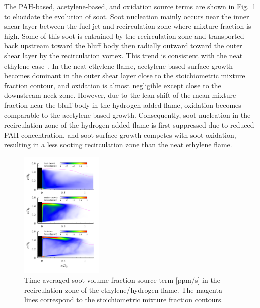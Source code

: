 \documentclass[review,3p,times]{elsarticle}
\begin{document}
The PAH-based, acetylene-based, and oxidation source terms are shown in Fig.~\ref{fig:sourceterms} to elucidate the evolution of soot. Soot nucleation mainly occurs near the inner shear layer between the fuel jet and recirculation zone where mixture fraction is high.  Some of this soot is entrained by the recirculation zone and transported back upstream toward the bluff body then radially outward toward the outer shear layer by the recirculation vortex.  This trend is consistent with the neat ethylene case~\cite{mueller13}.  In the neat ethylene flame, acetylene-based surface growth becomes dominant in the outer shear layer close to the stoichiometric mixture fraction contour, and oxidation is almost negligible except close to the downstream neck zone.  However, due to the lean shift of the mean mixture fraction near the bluff body in the hydrogen added flame, oxidation becomes comparable to the acetylene-based growth.  Consequently, soot nucleation in the recirculation zone of the hydrogen added flame is first suppressed due to reduced PAH concentration, and soot surface growth competes with soot oxidation, resulting in a less sooting recirculation zone than the neat ethylene flame.

 \begin{figure}[t]
  \centering
  \scriptsize
  \vspace{-0.10in}
  \includegraphics[trim=5mm 5.0mm 10mm 3.0mm, clip=true, width=0.35\textwidth]{sourceterm.png}
  \normalsize
  \vspace{-0.2in}
  \caption{Time-averaged soot volume fraction source term [ppm/s] in the recirculation zone of the ethylene/hydrogen flame.  The magenta lines correspond to the stoichiometric mixture fraction contours.}
  \label{fig:sourceterms}
\end{figure}
\end{document}
